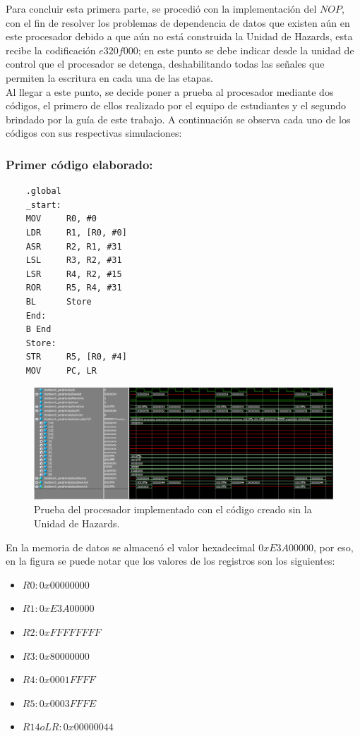 Para concluir esta primera parte, se procedió con la implementación del $NOP$, con el fin de resolver los problemas de dependencia de datos que existen aún en este procesador debido a que aún no está construida la Unidad de Hazards, esta recibe la codificación $e320f000$; en este punto se debe indicar desde la unidad de control que el procesador se detenga, deshabilitando todas las señales que permiten la escritura en cada una de las etapas.\\

Al llegar a este punto, se decide poner a prueba al procesador mediante dos códigos, el primero de ellos realizado por el equipo de estudiantes y el segundo brindado por la guía de este trabajo. A continuación se observa cada uno de los códigos con sus respectivas simulaciones:
  
\subsubsection*{Primer código elaborado:}
\begin{lstlisting}
	.global
	_start:
	MOV 	R0, #0
	LDR 	R1, [R0, #0]
	ASR 	R2, R1, #31
	LSL 	R3, R2, #31
	LSR		R4, R2, #15
	ROR 	R5, R4, #31
	BL		Store
	End:
	B End
	Store:
	STR		R5, [R0, #4]
	MOV		PC, LR
\end{lstlisting}

\begin{figure}[H]
	\centering
	\includegraphics[width = \linewidth]{images/SimulacioncreadasinH.PNG}
	\caption{Prueba del procesador implementado con el código creado sin la Unidad de Hazards.}
	\label{fig:Código creado sin unidad de Hazards}
\end{figure}

En la memoria de datos se almacenó el valor hexadecimal $0xE3A00000$, por eso, en la figura se puede notar que los valores de los registros son los siguientes:

\begin{itemize}
	\item $R0:0x00000000$
	\item $R1:0xE3A00000$
	\item $R2:0xFFFFFFFF$
	\item $R3:0x80000000$
	\item $R4:0x0001FFFF$
	\item $R5:0x0003FFFE$
	\item $R14 o LR:0x00000044$
\end{itemize}

